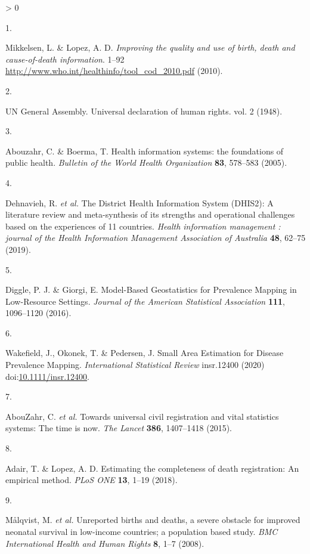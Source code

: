 \documentclass[
]{article}
\newlength{\cslhangindent}
\newlength{\csllabelwidth}
\newenvironment{CSLReferences}[2] %
 {%
  \setlength{\parindent}{0pt}
  \ifodd #1 \everypar{\setlength{\hangindent}{\cslhangindent}}\ignorespaces\fi
  \ifnum #2 > 0
  \setlength{\parskip}{#2\baselineskip}
  \fi
 }%
 {}
\newcommand{\CSLLeftMargin}[1]{\parbox[t]{\csllabelwidth}{#1}}
\newcommand{\CSLRightInline}[1]{\parbox[t]{\linewidth - \csllabelwidth}{#1}\break}
\begin{document}
\hypertarget{refs}{}
\begin{CSLReferences}{0}{0}
\leavevmode\hypertarget{ref-Mikkelsen2010}{}%
\CSLLeftMargin{1. }
\CSLRightInline{Mikkelsen, L. \& Lopez, A. D. \emph{{Improving the quality and use of birth, death and cause-of-death information}}. 1--92 \url{http://www.who.int/healthinfo/tool_cod_2010.pdf} (2010).}

\leavevmode\hypertarget{ref-srs}{}%
\CSLLeftMargin{2. }
\CSLRightInline{UN General Assembly. {Universal declaration of human rights}. vol. 2 (1948).}

\leavevmode\hypertarget{ref-Abouzahr2005}{}%
\CSLLeftMargin{3. }
\CSLRightInline{Abouzahr, C. \& Boerma, T. {Health information systems: the foundations of public health}. \emph{Bulletin of the World Health Organization} \textbf{83}, 578--583 (2005).}

\leavevmode\hypertarget{ref-Dehnavieh2019}{}%
\CSLLeftMargin{4. }
\CSLRightInline{Dehnavieh, R. \emph{et al.} {The District Health Information System (DHIS2): A literature review and meta-synthesis of its strengths and operational challenges based on the experiences of 11 countries}. \emph{Health information management : journal of the Health Information Management Association of Australia} \textbf{48}, 62--75 (2019).}

\leavevmode\hypertarget{ref-Diggle2016}{}%
\CSLLeftMargin{5. }
\CSLRightInline{Diggle, P. J. \& Giorgi, E. {Model-Based Geostatistics for Prevalence Mapping in Low-Resource Settings}. \emph{Journal of the American Statistical Association} \textbf{111}, 1096--1120 (2016).}

\leavevmode\hypertarget{ref-Wakefield2020}{}%
\CSLLeftMargin{6. }
\CSLRightInline{Wakefield, J., Okonek, T. \& Pedersen, J. {Small Area Estimation for Disease Prevalence Mapping}. \emph{International Statistical Review} insr.12400 (2020) doi:\href{https://doi.org/10.1111/insr.12400}{10.1111/insr.12400}.}

\leavevmode\hypertarget{ref-AbouZahr2015}{}%
\CSLLeftMargin{7. }
\CSLRightInline{AbouZahr, C. \emph{et al.} {Towards universal civil registration and vital statistics systems: The time is now}. \emph{The Lancet} \textbf{386}, 1407--1418 (2015).}

\leavevmode\hypertarget{ref-Adair2018}{}%
\CSLLeftMargin{8. }
\CSLRightInline{Adair, T. \& Lopez, A. D. {Estimating the completeness of death registration: An empirical method}. \emph{PLoS ONE} \textbf{13}, 1--19 (2018).}

\leavevmode\hypertarget{ref-Malqvist2008}{}%
\CSLLeftMargin{9. }
\CSLRightInline{Målqvist, M. \emph{et al.} {Unreported births and deaths, a severe obstacle for improved neonatal survival in low-income countries; a population based study}. \emph{BMC International Health and Human Rights} \textbf{8}, 1--7 (2008).}


\end{CSLReferences}
\end{document}
